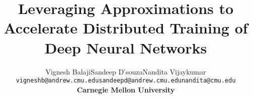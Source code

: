 \documentclass[pageno]{jpaper}
\begin{document}
\title{Leveraging Approximations to Accelerate Distributed Training of \\ Deep Neural Networks}

\DeclareRobustCommand{\authorthing}{
\begin{tabular}[t]{ccc}
Vignesh Balaji & Sandeep D'souza & Nandita Vijaykumar \\
\texttt{vigneshb@andrew.cmu.edu} & \texttt{sandeepd@andrew.cmu.edu} & \texttt{nandita@cmu.edu}\\
\multicolumn{3}{c}{\textbf{Carnegie Mellon University}}
\end{tabular}
}
\author{\authorthing}

\date{}
\maketitle
\let\oldtabular\tabular
\renewcommand{\tabular}{\footnotesize\oldtabular}

\thispagestyle{empty}













\end{document}
